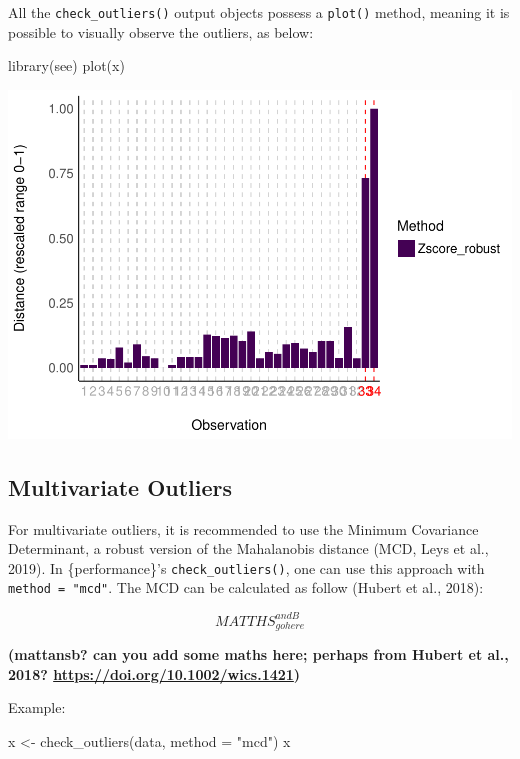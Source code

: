 \documentclass[
]{article}
\newenvironment{Shaded}{\begin{snugshade}}{\end{snugshade}}
\newcommand{\AttributeTok}[1]{\textcolor[rgb]{0.77,0.63,0.00}{#1}}
\newcommand{\FunctionTok}[1]{\textcolor[rgb]{0.00,0.00,0.00}{#1}}
\newcommand{\NormalTok}[1]{#1}
\newcommand{\OtherTok}[1]{\textcolor[rgb]{0.56,0.35,0.01}{#1}}
\newcommand{\StringTok}[1]{\textcolor[rgb]{0.31,0.60,0.02}{#1}}
\begin{document}
All the \texttt{check\_outliers()} output objects possess a
\texttt{plot()} method, meaning it is possible to visually observe the
outliers, as below:

\begin{Shaded}
\begin{Highlighting}[]
\FunctionTok{library}\NormalTok{(see)}
\FunctionTok{plot}\NormalTok{(x)}
\end{Highlighting}
\end{Shaded}

\includegraphics{paper_files/figure-latex/univariate plot-1.pdf}

\hypertarget{multivariate-outliers}{%
\subsection{Multivariate Outliers}\label{multivariate-outliers}}

For multivariate outliers, it is recommended to use the Minimum
Covariance Determinant, a robust version of the Mahalanobis distance
(MCD, Leys et al., 2019). In \{performance\}'s
\texttt{check\_outliers()}, one can use this approach with
\texttt{method\ =\ "mcd"}. The MCD can be calculated as follow (Hubert
et al., 2018):

\[
MATTHS_{gohere}^{andB}
\]

\textbf{(\textbf{mattansb?} can you add some maths here; perhaps from
Hubert et al., 2018? \url{https://doi.org/10.1002/wics.1421})}

Example:

\begin{Shaded}
\begin{Highlighting}[]
\NormalTok{x }\OtherTok{\textless{}{-}} \FunctionTok{check\_outliers}\NormalTok{(data, }\AttributeTok{method =} \StringTok{"mcd"}\NormalTok{)}
\NormalTok{x}
\end{Highlighting}
\end{Shaded}
\end{document}
